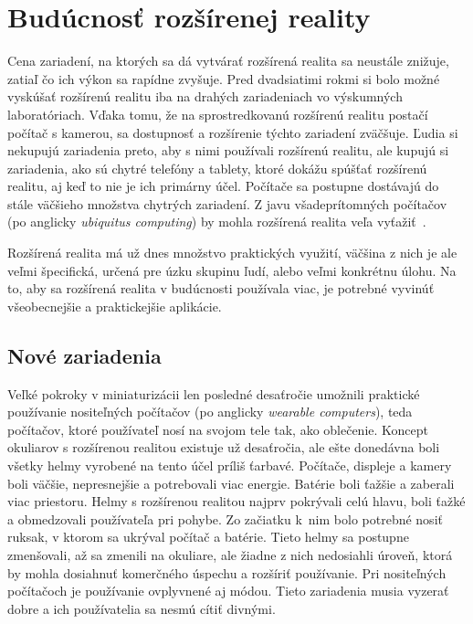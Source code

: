 \chapter{Budúcnosť rozšírenej reality}
\def\thepage{\textit{\arabic{page}}}

Cena zariadení, na ktorých sa dá vytvárať rozšírená realita sa neustále znižuje, zatiaľ čo ich výkon sa rapídne zvyšuje. Pred dvadsiatimi rokmi si bolo možné vyskúšať rozšírenú realitu iba na drahých zariadeniach vo výskumných laboratóriach. Vďaka tomu, že na sprostredkovanú rozšírenú realitu postačí počítač
s kamerou, sa dostupnosť a rozšírenie týchto zariadení zväčšuje. Ľudia si nekupujú zariadenia preto, aby s nimi používali rozšírenú realitu, ale kupujú si zariadenia,
ako sú chytré telefóny a tablety, ktoré dokážu spúšťať rozšírenú realitu, aj keď to nie je ich primárny účel. Počítače sa postupne dostávajú do stále väčšieho množstva chytrých zariadení. Z javu všadeprítomných počítačov (po anglicky \emph{ubiquitus computing}) by mohla rozšírená realita veľa vyťažiť~\cite{Zhou08}.

Rozšírená realita má už dnes množstvo praktických využití, väčšina z nich je ale veľmi špecifická, určená pre úzku skupinu ľudí, alebo veľmi konkrétnu úlohu. Na to, aby sa rozšírená realita v budúcnosti používala viac, je potrebné
vyvinúť všeobecnejšie a praktickejšie aplikácie.

\section{Nové zariadenia}

Veľké pokroky v miniaturizácii len posledné desaťročie umožnili praktické používanie nositeľných počítačov (po anglicky \emph{wearable computers}), teda počítačov, ktoré používateľ nosí na svojom tele tak, ako oblečenie. Koncept okuliarov s rozšírenou realitou existuje už desaťročia, ale ešte donedávna boli všetky helmy vyrobené na tento účel príliš ťarbavé. Počítače, displeje a kamery boli väčšie, nepresnejšie a potrebovali viac energie. Batérie boli ťažšie a zaberali viac priestoru. Helmy s rozšírenou realitou najprv pokrývali celú hlavu, boli ťažké a obmedzovali používateľa pri pohybe. Zo začiatku k~nim bolo potrebné nosiť ruksak, v ktorom sa ukrýval počítač a batérie. Tieto helmy sa postupne zmenšovali, až sa zmenili na okuliare, ale žiadne z nich nedosiahli úroveň, ktorá by mohla dosiahnuť komerčného úspechu a rozšíriť používanie. Pri nositeľných počítačoch je používanie ovplyvnené aj módou. Tieto zariadenia musia vyzerať dobre a ich používatelia sa nesmú cítiť divnými.

